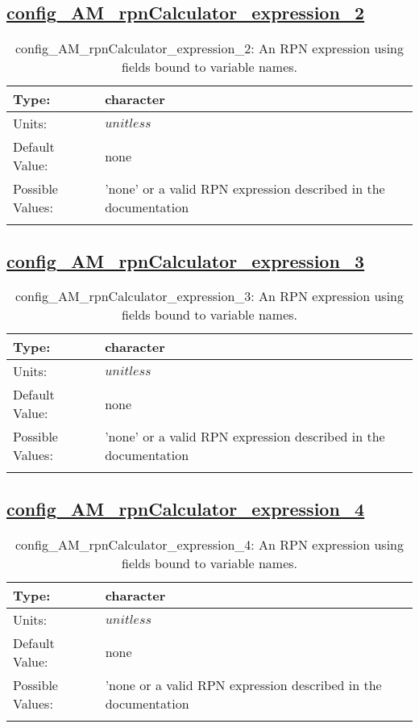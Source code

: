 \subsection[config\_AM\_rpnCalculator\_expression\_2]{\hyperref[sec:nm_tab_AM_rpnCalculator]{config\_AM\_rpnCalculator\_expression\_2}}
\label{subsec:nm_sec_config_AM_rpnCalculator_expression_2}
\begin{center}
\begin{longtable}{| p{2.0in} || p{4.0in} |}
    \hline
    Type: & character \\
    \hline
    Units: & $unitless$ \\
    \hline
    Default Value: & none \\
    \hline
    Possible Values: & 'none' or a valid RPN expression described in the documentation \\
    \hline
    \caption{config\_AM\_rpnCalculator\_expression\_2: An RPN expression using fields bound to variable names.}
\end{longtable}
\end{center}
\subsection[config\_AM\_rpnCalculator\_expression\_3]{\hyperref[sec:nm_tab_AM_rpnCalculator]{config\_AM\_rpnCalculator\_expression\_3}}
\label{subsec:nm_sec_config_AM_rpnCalculator_expression_3}
\begin{center}
\begin{longtable}{| p{2.0in} || p{4.0in} |}
    \hline
    Type: & character \\
    \hline
    Units: & $unitless$ \\
    \hline
    Default Value: & none \\
    \hline
    Possible Values: & 'none' or a valid RPN expression described in the documentation \\
    \hline
    \caption{config\_AM\_rpnCalculator\_expression\_3: An RPN expression using fields bound to variable names.}
\end{longtable}
\end{center}
\subsection[config\_AM\_rpnCalculator\_expression\_4]{\hyperref[sec:nm_tab_AM_rpnCalculator]{config\_AM\_rpnCalculator\_expression\_4}}
\label{subsec:nm_sec_config_AM_rpnCalculator_expression_4}
\begin{center}
\begin{longtable}{| p{2.0in} || p{4.0in} |}
    \hline
    Type: & character \\
    \hline
    Units: & $unitless$ \\
    \hline
    Default Value: & none \\
    \hline
    Possible Values: & 'none or a valid RPN expression described in the documentation \\
    \hline
    \caption{config\_AM\_rpnCalculator\_expression\_4: An RPN expression using fields bound to variable names.}
\end{longtable}
\end{center}
